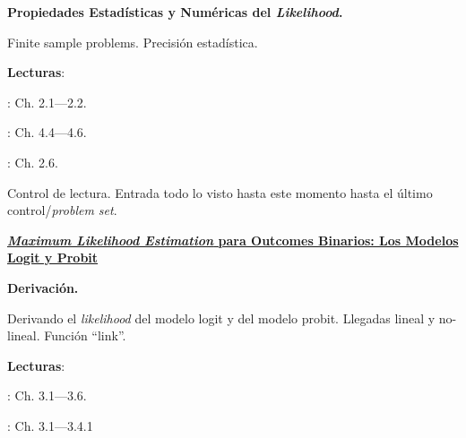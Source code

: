 \documentclass[letterpaper]{article}
\renewenvironment{itemize}{
  \begin{list}{}{
    \setlength{\leftmargin}{1.5em}
  }
}{
  \end{list}
}
\begin{document}
\begin{enumerate}[label=\roman*.]
      \begin{itemize} 
        \item[10.] {\bf Propiedades Estad\'isticas y Num\'ericas del \emph{Likelihood}.}
        \begin{itemize} 
          \item[$\circ$] Finite sample problems. Precisi\'on estad\'istica.
          \item[$\circ$] {\bf Lecturas}: 
            \begin{itemize} 
              \item[$\diamond$] \textcite{Ward2018}: Ch. 2.1---2.2. 
              \item[$\diamond$] \textcite{King1998}: Ch. 4.4---4.6.
              \item[$\diamond$] \textcite{Long2001}: Ch. 2.6.
            \end{itemize}
        \end{itemize}
      \end{itemize}

\item[{\color{red}\Pointinghand}] Control de lectura. Entrada todo lo visto hasta este momento hasta el \'ultimo control/\emph{problem set}.


\item {\bf {\color{ForestGreen}\underline{\emph{Maximum Likelihood Estimation} para Outcomes Binarios: Los Modelos Logit y Probit}}}


        \begin{itemize} 
        \item[11.] {\bf Derivaci\'on.}
        \begin{itemize} 
          \item[$\circ$] Derivando el \emph{likelihood} del modelo logit y del modelo probit. Llegadas lineal y no-lineal. Funci\'on ``link''.
          \item[$\circ$] {\bf Lecturas}: 
            \begin{itemize} 
              \item[$\diamond$] \textcite{Long2001}: Ch. 3.1---3.6.
              \item[$\diamond$] \textcite{Ward2018}: Ch. 3.1---3.4.1
            \end{itemize}
        \end{itemize}
      \end{itemize}


\end{enumerate}
\end{document}
